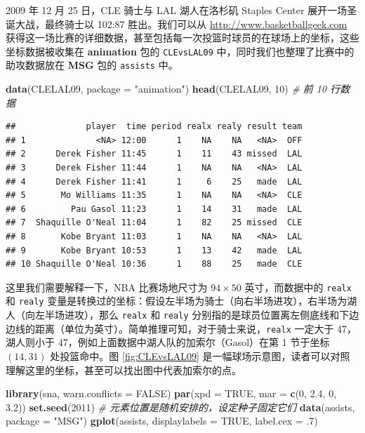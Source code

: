 \documentclass[
  b5paper,
  UTF8,twoside]{book}
\newenvironment{Shaded}{\begin{snugshade}}{\end{snugshade}}
\newcommand{\AttributeTok}[1]{\textcolor[rgb]{0.13,0.29,0.53}{#1}}
\newcommand{\CommentTok}[1]{\textcolor[rgb]{0.56,0.35,0.01}{\textit{#1}}}
\newcommand{\ConstantTok}[1]{\textcolor[rgb]{0.56,0.35,0.01}{#1}}
\newcommand{\DecValTok}[1]{\textcolor[rgb]{0.00,0.00,0.81}{#1}}
\newcommand{\FloatTok}[1]{\textcolor[rgb]{0.00,0.00,0.81}{#1}}
\newcommand{\FunctionTok}[1]{\textcolor[rgb]{0.13,0.29,0.53}{\textbf{#1}}}
\newcommand{\NormalTok}[1]{#1}
\newcommand{\StringTok}[1]{\textcolor[rgb]{0.31,0.60,0.02}{#1}}
\begin{document}
2009 年 12 月 25 日，CLE 骑士与 LAL 湖人在洛杉矶 Staples Center 展开一场圣诞大战，最终骑士以 102:87 胜出。我们可以从 \url{http://www.basketballgeek.com} 获得这一场比赛的详细数据，甚至包括每一次投篮时球员的在球场上的坐标，这些坐标数据被收集在 \textbf{animation} 包的 \texttt{CLEvsLAL09} 中，同时我们也整理了比赛中的助攻数据放在 \textbf{MSG} 包的 \texttt{assists} 中。

\begin{Shaded}
\begin{Highlighting}[]
\FunctionTok{data}\NormalTok{(CLELAL09, }\AttributeTok{package =} \StringTok{"animation"}\NormalTok{)}
\FunctionTok{head}\NormalTok{(CLELAL09, }\DecValTok{10}\NormalTok{) }\CommentTok{\# 前 10 行数据}
\end{Highlighting}
\end{Shaded}

\begin{verbatim}
##              player  time period realx realy result team
## 1              <NA> 12:00      1    NA    NA   <NA>  OFF
## 2      Derek Fisher 11:45      1    11    43 missed  LAL
## 3      Derek Fisher 11:44      1    NA    NA   <NA>  LAL
## 4      Derek Fisher 11:41      1     6    25   made  LAL
## 5       Mo Williams 11:35      1    NA    NA   <NA>  CLE
## 6         Pau Gasol 11:23      1    14    31   made  LAL
## 7  Shaquille O'Neal 11:04      1    82    25 missed  CLE
## 8       Kobe Bryant 11:03      1    NA    NA   <NA>  LAL
## 9       Kobe Bryant 10:53      1    13    42   made  LAL
## 10 Shaquille O'Neal 10:36      1    88    25   made  CLE
\end{verbatim}

这里我们需要解释一下，NBA 比赛场地尺寸为 \(94\times50\) 英寸，而数据中的 \texttt{realx} 和 \texttt{realy} 变量是转换过的坐标：假设左半场为骑士（向右半场进攻），右半场为湖人（向左半场进攻），那么 \texttt{realx} 和 \texttt{realy} 分别指的是球员位置离左侧底线和下边边线的距离（单位为英寸）。简单推理可知，对于骑士来说，\texttt{realx} 一定大于 47，湖人则小于 47，例如上面数据中湖人队的加索尔（Gasol）在第 1 节于坐标 \((14,31)\) 处投篮命中。图 \ref{fig:CLEvsLAL09} 是一幅球场示意图，读者可以对照理解这里的坐标，甚至可以找出图中代表加索尔的点。

\begin{Shaded}
\begin{Highlighting}[]
\FunctionTok{library}\NormalTok{(sna, }\AttributeTok{warn.conflicts =} \ConstantTok{FALSE}\NormalTok{)}
\FunctionTok{par}\NormalTok{(}\AttributeTok{xpd =} \ConstantTok{TRUE}\NormalTok{, }\AttributeTok{mar =} \FunctionTok{c}\NormalTok{(}\DecValTok{0}\NormalTok{, }\FloatTok{2.4}\NormalTok{, }\DecValTok{0}\NormalTok{, }\FloatTok{3.2}\NormalTok{))}
\FunctionTok{set.seed}\NormalTok{(}\DecValTok{2011}\NormalTok{) }\CommentTok{\# 元素位置是随机安排的，设定种子固定它们}
\FunctionTok{data}\NormalTok{(assists, }\AttributeTok{package =} \StringTok{"MSG"}\NormalTok{)}
\FunctionTok{gplot}\NormalTok{(assists, }\AttributeTok{displaylabels =} \ConstantTok{TRUE}\NormalTok{, }\AttributeTok{label.cex =}\NormalTok{ .}\DecValTok{7}\NormalTok{)}
\end{Highlighting}
\end{Shaded}
\end{document}
